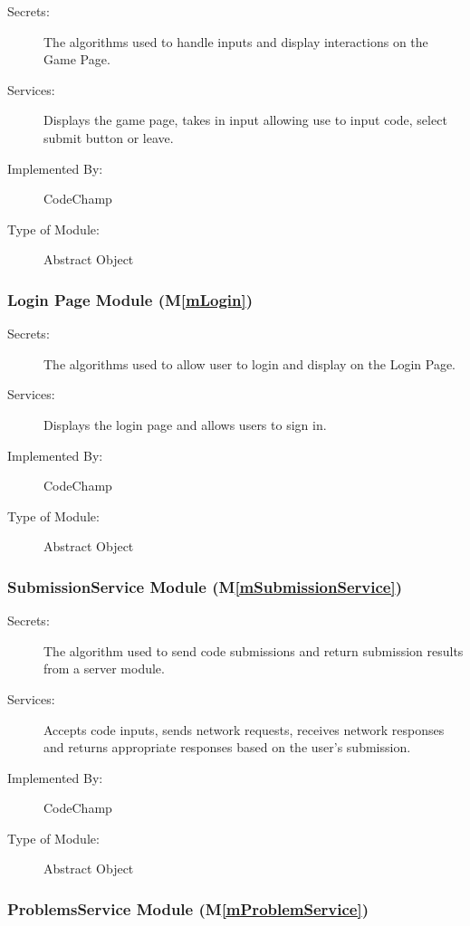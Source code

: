 \documentclass[12pt, titlepage]{article}
\newcommand{\mref}[1]{M\ref{#1}}
\begin{document}
\begin{description}
\item[Secrets:] The algorithms used to handle inputs and display interactions on the Game Page.
\item[Services:] Displays the game page, takes in input allowing use to input code, select submit button or leave.
\item[Implemented By:] CodeChamp
\item[Type of Module:] Abstract Object
\end{description}

\subsubsection{ Login Page Module (\mref{mLogin})}

\begin{description}
\item[Secrets:] The algorithms used to allow user to login and display on the Login Page.
\item[Services:] Displays the login page and allows users to sign in.
\item[Implemented By:] CodeChamp
\item[Type of Module:] Abstract Object
\end{description}

\subsubsection{ SubmissionService Module (\mref{mSubmissionService})}

\begin{description}
\item[Secrets:] The algorithm used to send code submissions and return submission results from a server module.
\item[Services:] Accepts code inputs, sends network requests, receives network responses and returns appropriate responses based on the user's submission.
\item[Implemented By:] CodeChamp
\item[Type of Module:] Abstract Object
\end{description}

\subsubsection{ ProblemsService Module (\mref{mProblemService})}
\end{document}
